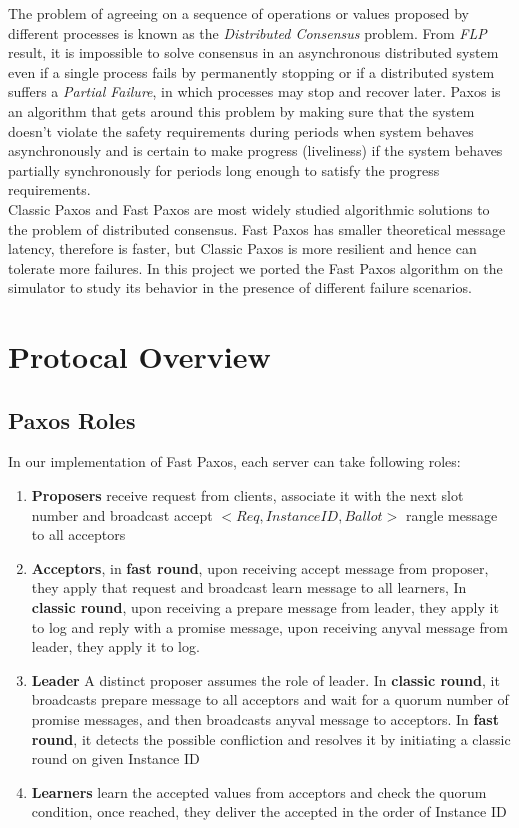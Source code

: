 The problem of agreeing on a sequence of operations or values proposed by different processes is known as the \textit{Distributed Consensus} problem. From \textit{FLP} result\cite{flpresult}, it is impossible to solve consensus in an asynchronous distributed system even if a single process fails by permanently stopping or if a distributed system suffers a \textit{Partial Failure}, in which processes may stop and recover later. Paxos is an algorithm that gets around this problem by making sure that the system doesn't violate the safety requirements during periods when system behaves asynchronously and is certain to make progress (liveliness) if the system behaves partially synchronously for periods long enough to satisfy the progress requirements.\\

\noindent Classic Paxos and Fast Paxos are most widely studied algorithmic solutions to the problem of distributed consensus. Fast Paxos has smaller theoretical message latency, therefore is faster, but Classic Paxos is more resilient and hence can tolerate more failures.
In this project we ported the Fast Paxos algorithm on the simulator to study its behavior in the presence of different failure scenarios. 

\section{Protocal Overview}
\label{sec:examples}

\subsection{Paxos Roles}
In our implementation of Fast Paxos, each server can take following roles:

\begin{enumerate}
\item {\textbf{Proposers} receive request from clients, associate it with the next slot number and broadcast accept $<Req, Instance ID, Ballot>$ rangle message to all acceptors}

\item {\textbf{Acceptors}, in \textbf{fast round}, upon receiving accept message from proposer, they apply that request and broadcast learn message to all learners, In \textbf{classic round}, upon receiving a prepare message from leader, they apply it to log and reply with a promise message, upon receiving anyval message from leader, they apply it to log.}
\item {\textbf{Leader} A distinct proposer assumes the role of leader. In \textbf{classic round}, it broadcasts prepare message to all acceptors and wait for a quorum number of promise messages, and then broadcasts anyval message to acceptors. In \textbf{fast round}, it detects the possible confliction and resolves it by initiating a classic round on given Instance ID}
\item {\textbf{Learners} learn the accepted values from acceptors and check the quorum condition, once reached, they deliver the accepted in the order of Instance ID}
\end{enumerate}

